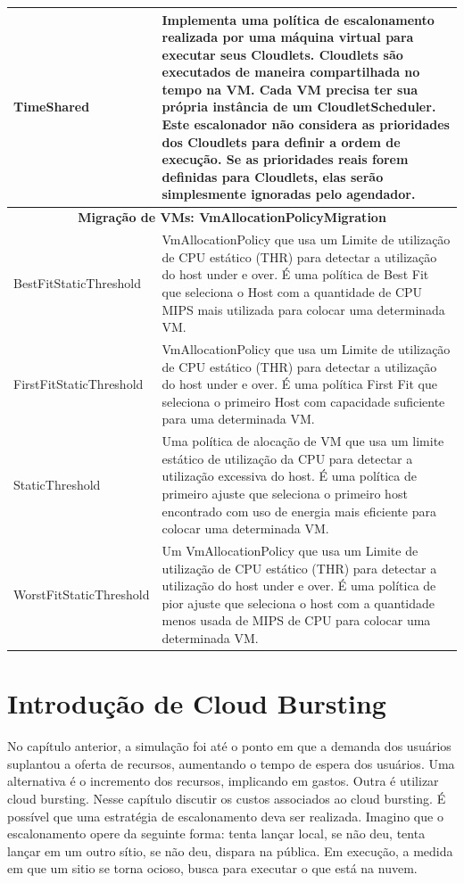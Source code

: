 \documentclass[tese,capa]{texufpel}
\begin{document}
\begin{table}[H]
{\begin{tabular}{@{}lm{11.2cm}@{}}
  \addlinespace[0.15cm]
  TimeShared              & Implementa uma política de escalonamento realizada por uma máquina virtual para executar seus Cloudlets. Cloudlets são executados de maneira compartilhada no tempo na VM. Cada VM precisa ter sua própria instância de um CloudletScheduler. Este escalonador não considera as prioridades dos Cloudlets para definir a ordem de execução. Se as prioridades reais forem definidas para Cloudlets, elas serão simplesmente ignoradas pelo agendador.	\\ 
  \midrule
  \multicolumn{2}{c}{\textbf{Migração de VMs: VmAllocationPolicyMigration}} \\ 
  \midrule
  BestFitStaticThreshold  & VmAllocationPolicy que usa um Limite de utilização de CPU estático (THR) para detectar a utilização do host {under} e {over}. É uma política de Best Fit que seleciona o Host com a quantidade de CPU MIPS mais utilizada para colocar uma determinada VM. \\
  \addlinespace[0.15cm]
  FirstFitStaticThreshold & VmAllocationPolicy que usa um Limite de utilização de CPU estático (THR) para detectar a utilização do host {under} e {over}. É uma política First Fit que seleciona o primeiro Host com capacidade suficiente para uma determinada VM.	\\
  \addlinespace[0.15cm]
  StaticThreshold         & Uma política de alocação de VM que usa um limite estático de utilização da CPU para detectar a utilização excessiva do host. É uma política de primeiro ajuste que seleciona o primeiro host encontrado com uso de energia mais eficiente para colocar uma determinada VM. \\
  \addlinespace[0.15cm]
  WorstFitStaticThreshold & Um VmAllocationPolicy que usa um Limite de utilização de CPU estático (THR) para detectar a utilização do host {under} e {over}. É uma política de pior ajuste que seleciona o host com a quantidade menos usada de MIPS de CPU para colocar uma determinada VM. \\ 
  \bottomrule
  \end{tabular}%
  }
  \end{table}

\chapter{Introdução de Cloud Bursting}

No capítulo anterior, a simulação foi até o ponto em que a demanda dos usuários suplantou a oferta de recursos, aumentando o tempo de espera dos usuários. Uma alternativa é o incremento dos recursos, implicando em gastos. Outra é utilizar cloud bursting. Nesse capítulo discutir os custos associados ao cloud bursting. É possível que uma estratégia de escalonamento deva ser realizada. Imagino que o escalonamento opere da seguinte forma: tenta lançar local, se não deu, tenta lançar em um outro sítio, se não deu, dispara na pública. Em execução, a medida em que um sitio se torna ocioso, busca para executar o que está na nuvem.
\end{document}
